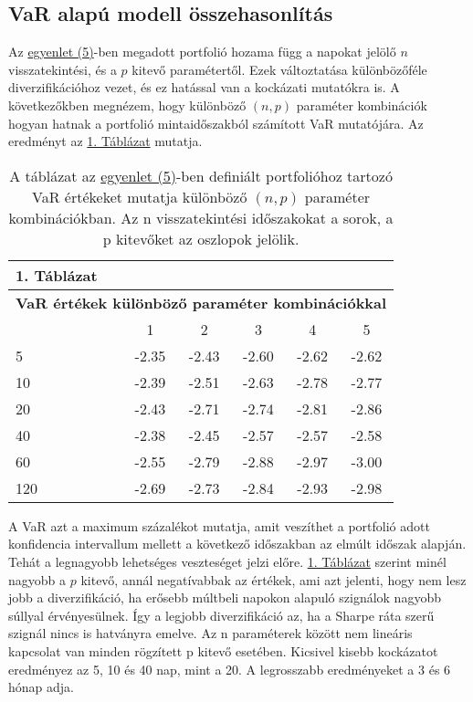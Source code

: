 \documentclass[a4paper,12pt]{article}
\begin{document}
\subsection{VaR alapú modell összehasonlítás}
Az \hyperref[eq:eq1]{egyenlet (5)}-ben megadott portfolió hozama függ a napokat jelölő $n$ visszatekintési, és a $p$ kitevő paramétertől. 
Ezek változtatása különbözőféle diverzifikációhoz vezet, és ez hatással van a kockázati mutatókra is. 
A következőkben megnézem, hogy különböző $(n,p)$ paraméter kombinációk hogyan hatnak a portfolió mintaidőszakból számított VaR mutatójára. 
Az eredményt az \hyperref[table:table1]{1. Táblázat} mutatja. 
\begin{table}[!ht]
\tiny
    \centering
    \begin{tabular}{lccccc}
\textbf{1. Táblázat} &&&& &  \\
\toprule
  \multicolumn{6}{c}{\textbf{VaR értékek különböző paraméter kombinációkkal}} \\  
\midrule
	 & 1 & 2 & 3 & 4 & 5 \\ 
\cmidrule{2-6}
        5 & -2.35 & -2.43 & -2.60 & -2.62 & -2.62 \\ 
        10 & -2.39 & -2.51 & -2.63 & -2.78 & -2.77 \\ 
        20 & -2.43 & -2.71 & -2.74 & -2.81 & -2.86 \\ 
        40 & -2.38 & -2.45 & -2.57 & -2.57 & -2.58 \\ 
        60 & -2.55 & -2.79 & -2.88 & -2.97 & -3.00 \\ 
        120 & -2.69 & -2.73 & -2.84 & -2.93 & -2.98 \\ 
\bottomrule
\end{tabular}
\caption*{\tiny 
A táblázat az \hyperref[eq:eq1]{egyenlet (5)}-ben definiált portfolióhoz tartozó VaR értékeket mutatja különböző $(n,p)$ paraméter kombinációkban. 
Az n visszatekintési időszakokat a sorok, a p kitevőket az oszlopok jelölik. 
}
\label{table:table1}
\end{table}
A VaR azt a maximum százalékot mutatja, amit veszíthet a portfolió adott konfidencia intervallum mellett a következő időszakban az elmúlt időszak alapján. 
Tehát a legnagyobb lehetséges veszteséget jelzi előre. 
\hyperref[table:table1]{1. Táblázat} szerint minél nagyobb a $p$ kitevő, annál negatívabbak az értékek, ami azt jelenti, hogy nem lesz jobb a diverzifikáció, ha erősebb múltbeli napokon alapuló szignálok nagyobb súllyal érvényesülnek. 
Így a legjobb diverzifikáció az, ha a Sharpe ráta szerű szignál nincs is hatványra emelve. 
Az n paraméterek között nem lineáris kapcsolat van minden rögzített p kitevő esetében. 
Kicsivel kisebb kockázatot eredményez az 5, 10 és 40 nap, mint a 20. A legrosszabb eredményeket a 3 és 6 hónap adja. 
\end{document}
